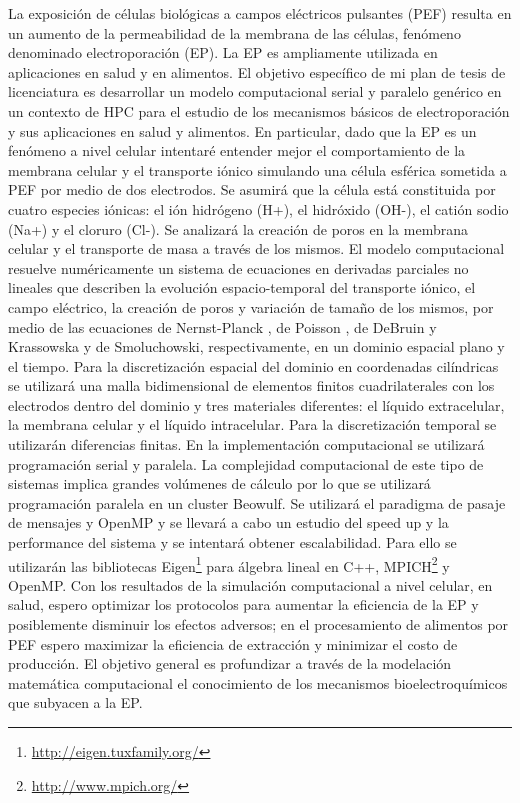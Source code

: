 \documentclass[a4paper,spanish]{article}
\begin{document}
La exposición de células biológicas a campos eléctricos pulsantes (PEF) resulta en un aumento de la permeabilidad de la membrana de las células, fenómeno denominado electroporación (EP). La EP es ampliamente utilizada en aplicaciones en salud y en alimentos. El objetivo específico de mi plan de tesis de licenciatura es desarrollar un modelo computacional serial y paralelo genérico en un contexto de HPC para el estudio de los mecanismos básicos de electroporación y sus aplicaciones en salud y alimentos.  En particular, dado que la EP es un fenómeno a nivel celular intentaré entender mejor el comportamiento de la membrana celular y el transporte iónico simulando una célula esférica sometida a PEF por medio de dos electrodos. Se asumirá que la célula está constituida  por cuatro especies iónicas: el ión hidrógeno (H+), el hidróxido (OH-), el catión sodio (Na+) y el cloruro (Cl-). Se  analizará la creación de poros en la membrana celular y el transporte de masa a través de los mismos. El modelo computacional resuelve numéricamente un sistema de ecuaciones en derivadas parciales no lineales que describen la evolución espacio-temporal del transporte iónico, el campo eléctrico, la creación de poros y variación de tamaño de los mismos, por medio de las ecuaciones de Nernst-Planck \cite{fodava}, de Poisson \cite{jianbo}, de DeBruin y Krassowska \cite{krass} y de Smoluchowski, respectivamente, en un dominio espacial plano y el tiempo. Para la discretización espacial del dominio en coordenadas cilíndricas se utilizará una malla bidimensional de  elementos finitos cuadrilaterales con los electrodos dentro del dominio y tres materiales diferentes: el líquido extracelular, la membrana celular y el líquido intracelular. Para la discretización temporal se utilizarán diferencias finitas. En la implementación computacional se utilizará programación serial y paralela. La complejidad computacional de este tipo de sistemas implica grandes volúmenes de cálculo por lo que se utilizará programación paralela en un cluster Beowulf. Se utilizará el paradigma de pasaje de mensajes y  OpenMP y se llevará a cabo un estudio del speed up y la performance del sistema y se intentará obtener escalabilidad. Para ello se utilizarán las bibliotecas Eigen\footnote{\href{http://eigen.tuxfamily.org/}{http://eigen.tuxfamily.org/}} para álgebra lineal en C++, MPICH\footnote{\href{http://www.mpich.org/}{http://www.mpich.org/}} y OpenMP. Con los resultados de la  simulación computacional a nivel celular, en salud, espero optimizar los protocolos para aumentar la eficiencia de la EP y posiblemente disminuir los efectos adversos; en el procesamiento de alimentos por PEF espero maximizar la eficiencia de extracción y minimizar el costo de producción. El objetivo general es profundizar a través de la modelación matemática computacional el conocimiento de los mecanismos bioelectroquímicos que subyacen a la EP.
\end{document}
